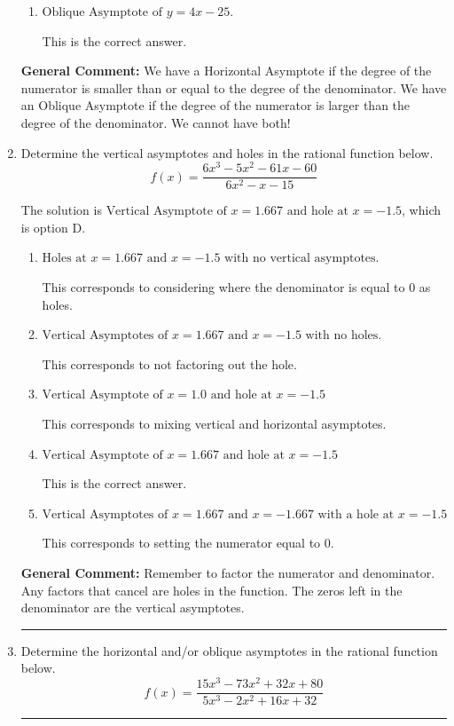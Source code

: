\documentclass{extbook}[14pt]
\newcommand{\litem}[1]{\item #1

\rule{\textwidth}{0.4pt}}
\begin{document}
\begin{enumerate}
{\begin{enumerate}[label=\Alph*.]
This corresponds to considering where the denominator is equal to 0 as horizontal asymptote.
\item \( \text{Oblique Asymptote of } y = 4x -25. \)

This is the correct answer.
\end{enumerate}

\textbf{General Comment:} We have a Horizontal Asymptote if the degree of the numerator is smaller than or equal to the degree of the denominator. We have an Oblique Asymptote if the degree of the numerator is larger than the degree of the denominator. We cannot have both!
}
\litem{
Determine the vertical asymptotes and holes in the rational function below.
\[ f(x) = \frac{6x^{3} -5 x^{2} -61 x -60}{6x^{2} -x -15} \]

The solution is \( \text{Vertical Asymptote of } x = 1.667 \text{ and hole at } x = -1.5 \), which is option D.\begin{enumerate}[label=\Alph*.]
\item \( \text{Holes at } x = 1.667 \text{ and } x = -1.5 \text{ with no vertical asymptotes.} \)

This corresponds to considering where the denominator is equal to 0 as holes.
\item \( \text{Vertical Asymptotes of } x = 1.667 \text{ and } x = -1.5 \text{ with no holes.} \)

This corresponds to not factoring out the hole.
\item \( \text{Vertical Asymptote of } x = 1.0 \text{ and hole at } x = -1.5 \)

This corresponds to mixing vertical and horizontal asymptotes.
\item \( \text{Vertical Asymptote of } x = 1.667 \text{ and hole at } x = -1.5 \)

This is the correct answer.
\item \( \text{Vertical Asymptotes of } x = 1.667 \text{ and } x = -1.667 \text{ with a hole at } x = -1.5 \)

This corresponds to setting the numerator equal to 0.
\end{enumerate}

\textbf{General Comment:} Remember to factor the numerator and denominator. Any factors that cancel are holes in the function. The zeros left in the denominator are the vertical asymptotes.
}
\litem{
Determine the horizontal and/or oblique asymptotes in the rational function below.
\[ f(x) = \frac{15x^{3} -73 x^{2} +32 x + 80}{5x^{3} -2 x^{2} +16 x + 32} \]

}
\end{enumerate}
\end{document}
